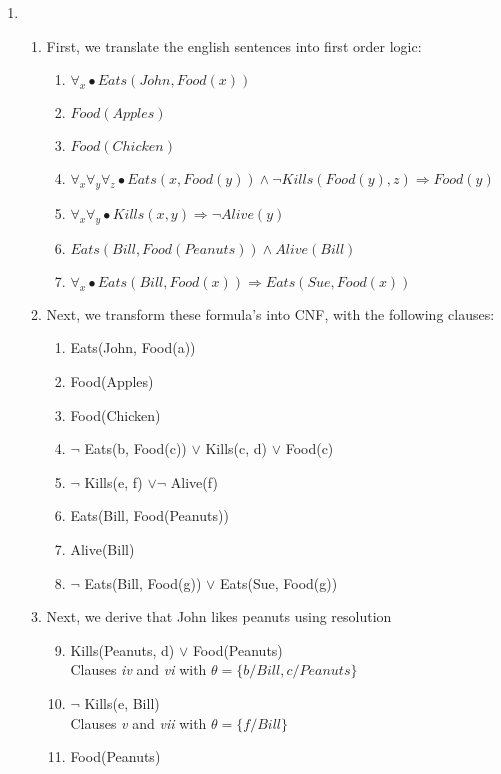 \documentclass[12pt]{article}
\begin{document}
\begin{enumerate}
	\item 
		\begin{enumerate}
			\item First, we translate the english sentences into first order logic:
			\begin{enumerate}
				\item $\forall_x \bullet Eats(John, Food(x))$
				\item $Food(Apples)$
				\item $Food(Chicken)$
				\item $\forall_x \forall_y \forall_z \bullet Eats(x, Food(y)) \land \neg Kills(Food(y), z) \Rightarrow Food(y)$
				\item $\forall_x \forall_y \bullet Kills(x, y) \Rightarrow \neg Alive(y)$
				\item $Eats(Bill, Food(Peanuts)) \land Alive(Bill)$
				\item $\forall_x \bullet Eats(Bill, Food(x)) \Rightarrow Eats(Sue, Food(x))$
			\end{enumerate}
			\item Next, we transform these formula's into CNF, with the following clauses:
			\begin{enumerate}
				\item Eats(John, Food(a))
				\item Food(Apples)
				\item Food(Chicken)
				\item $\neg$ Eats(b, Food(c)) $\lor$ Kills(c, d) $\lor$ Food(c)
				\item $\neg$ Kills(e, f) $\lor \neg$ Alive(f)
				\item Eats(Bill, Food(Peanuts))
				\item Alive(Bill)
				\item $\neg$ Eats(Bill, Food(g)) $\lor$ Eats(Sue, Food(g))
			\end{enumerate}
			\item Next, we derive that John likes peanuts using resolution
			\begin{enumerate}
			  	\setcounter{enumiii}{8}
				\item Kills(Peanuts, d) $\lor$ Food(Peanuts) \\
					Clauses \textit{iv} and \textit{vi} with $ \theta = \{ b/Bill, c/Peanuts \} $
				\item $\neg$ Kills(e, Bill) \\
					Clauses \textit{v} and \textit{vii} with $ \theta = \{ f/Bill \} $
				\item Food(Peanuts) \\

\end{enumerate}
\end{enumerate}
\end{enumerate}
\end{document}

